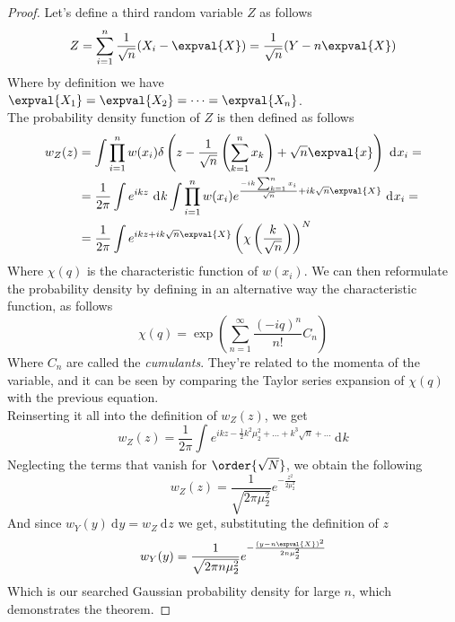 \documentclass[a4paper, 11pt]{book}
\newcommand{\1}{\opr{\mathds{1}}}
\newcommand{\diff}[2][]{\ \mathrm{d}^{#1}#2}
\theoremstyle{plain}
\begin{document}
	\begin{proof}
		Let's define a third random variable $Z$ as follows
		\begin{equation*}
			Z=\sum_{i=1}^n\frac{1}{\sqrt{n}}(X_i-\expval{X})=\frac{1}{\sqrt{n}}(Y-n\expval{X})
		\end{equation*}
		Where by definition we have $\expval{X_1}=\expval{X_2}=\cdots=\expval{X_n}$.\\
		The probability density function of $Z$ is then defined as follows
		\begin{equation*}
			\begin{aligned}
				w_Z(z)&=\int \prod_{i=1}^nw(x_i)\delta\left( z-\frac{1}{\sqrt{n}}\left( \sum_{k=1}^nx_k \right)+\sqrt{n}\expval{x} \right)\diff{x_i}=\\
				&=\frac{1}{2\pi}\int e^{ikz}\diff{k}\int\prod_{i=1}^nw(x_i)e^{\frac{-ik\sum_{k=1}^nx_i}{\sqrt{n}}+ik\sqrt{n}\expval{X}}\diff{x_i}=\\
				&=\frac{1}{2\pi}\int e^{ikz+ik\sqrt{n}\expval{X}}\left( \chi\left( \frac{k}{\sqrt{n}} \right) \right)^N
			\end{aligned}
		\end{equation*}
		Where $\chi(q)$ is the characteristic function of $w(x_i)$. We can then reformulate the probability density by defining in an alternative way the characteristic function, as follows
		\begin{equation*}
			\chi(q)=\exp\left( \sum_{n=1}^{\infty}\frac{(-iq)^n}{n!}C_n \right)
		\end{equation*}
		Where $C_n$ are called the \textit{cumulants}. They're related to the momenta of the variable, and it can be seen by comparing the Taylor series expansion of $\chi(q)$ with the previous equation.\\
		Reinserting it all into the definition of $w_Z(z)$, we get
		\begin{equation*}
			w_Z(z)=\frac{1}{2\pi}\int_{}^{}e^{ikz-\frac{1}{2}k^2\mu_2^2+\ldots+k^3\sqrt{n}+\ldots}\diff{k}
		\end{equation*}
		Neglecting the terms that vanish for $\order{\sqrt{N}}$, we obtain the following
		\begin{equation*}
			w_Z(z)=\frac{1}{\sqrt{2\pi\mu_2^2}}e^{-\frac{z^2}{2\mu_2^2}}
		\end{equation*}
		And since $w_Y(y)\diff{y}=w_Z\diff{z}$ we get, substituting the definition of $z$
		\begin{equation*}
			w_Y(y)=\frac{1}{\sqrt{2\pi n\mu_2^2}}e^{-\frac{(y-n\expval{X})^2}{2n\mu_2^2}}
		\end{equation*}
		Which is our searched Gaussian probability density for large $n$, which demonstrates the theorem.
	\end{proof}
\end{document}
